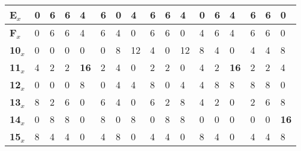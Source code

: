 \begin{longtable}[c]{|l|l|l|l|l|l|l|l|l|l|l|l|l|l|l|l|l|}
\textbf{E$_x$}  & 0              & 6              & 6              & 4              & 6              & 0              & 4              & 6              & 6              & 4              & 0              & 6              & 4              & 6              & 6              & 0              \\ \hline
\textbf{F$_x$}  & 0              & 6              & 6              & 4              & 6              & 4              & 0              & 6              & 6              & 0              & 4              & 6              & 4              & 6              & 6              & 0              \\ \hline
\textbf{10$_x$} & 0              & 0              & 0              & 0              & 0              & 8              & 12             & 4              & 0              & 12             & 8              & 4              & 0              & 4              & 4              & 8              \\ \hline
\textbf{11$_x$} & 4              & 2              & 2              & \textbf{16}             & 2              & 4              & 0              & 2              & 2              & 0              & 4              & 2              & \textbf{16}             & 2              & 2              & 4              \\ \hline
\textbf{12$_x$} & 0              & 0              & 0              & 8              & 0              & 4              & 4              & 8              & 0              & 4              & 4              & 8              & 8              & 8              & 8              & 0              \\ \hline
\textbf{13$_x$} & 8              & 2              & 6              & 0              & 6              & 4              & 0              & 6              & 2              & 8              & 4              & 2              & 0              & 2              & 6              & 8              \\ \hline
\textbf{14$_x$} & 0              & 8              & 8              & 0              & 8              & 0              & 8              & 0              & 8              & 8              & 0              & 0              & 0              & 0              & 0              & \textbf{16}             \\ \hline
\textbf{15$_x$} & 8              & 4              & 4              & 0              & 4              & 8              & 0              & 4              & 4              & 0              & 8              & 4              & 0              & 4              & 4              & 8              \\ \hline

\end{longtable}
